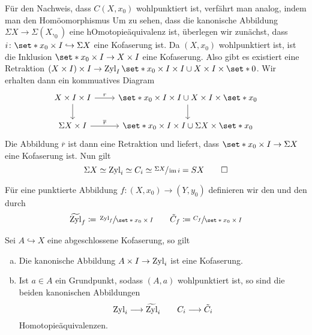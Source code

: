 \begin{beweis}
	Für den Nachweis, dass $C(X,x_0)$ wohlpunktiert ist, verfährt man analog, indem man den Homöomorphismus 
	Um zu sehen, dass die kanonische Abbildung $\Sigma X \to \Sigma(X,_0)$ eine hOmotopieäquivalenz ist, überlegen wir zunächst, dass $i \colon \set*{x_0} \times I \hookrightarrow \Sigma X$ eine Kofaserung ist.
	Da $(X,x_0)$ wohlpunktiert ist, ist die Inklusion $\set*{x_0} \times I \to X \times I$ eine Kofaserung.
	Also gibt es existiert eine Retraktion $(X \times I) \times I \to \Zyl_I \set*{x_0} \times I \times I \cup X \times I \times \set*{0}$.
	Wir erhalten dann ein kommuatives Diagram
	\[
		\begin{tikzcd}
			X \times I \times I \rar["r"] \dar &  \set*{x_0} \times I \times I \cup X \times I \times \set*{x_0} \dar \\
			\Sigma X \times I \rar["\overline{r}"] & \set*{x_0} \times I \times I \cup \Sigma X \times \set*{x_0}
		\end{tikzcd}
	\]
	Die Abbildung $\overline{r}$ ist dann eine Retraktion und liefert, dass $\set*{x_0} \times I \to \Sigma X$ eine Kofaserung ist.
	Nun gilt
	\[
		\Sigma X \simeq \operatorname{Zyl}_i \simeq C_i \simeq \sfrac{\Sigma X}{\operatorname{im} i} = S X \qedhere
	\]
\end{beweis}

\begin{definition}
	Für eine punktierte Abbildung $f \colon (X,x_0) \to (Y,y_0)$ definieren wir den  und den  durch
	\[
		\rZyl_f \coloneqq \sfrac{\Zyl_f}{\set*{x_0} \times I} \qquad \tilde{C}_f \coloneqq \sfrac{C_f}{\set*{x_0} \times I}
	\]
\end{definition}

\begin{satz}[label=satz:abg-kofaserung]
	Sei $A \hookrightarrow X$ eine abgeschlossene Kofaserung, so gilt
	\begin{enumerate}[(a)]
		\item Die kanonische Abbildung $A \times I \to \operatorname{Zyl}_i$ ist eine Kofaserung.
		\item Ist $a \in A$ ein Grundpunkt, sodass $(A,a)$ wohlpunktiert ist, so sind die beiden kanonischen Abbildungen 
		\[
			\operatorname{Zyl}_i \longrightarrow \widetilde{\operatorname{Zyl}}_i \qquad C_i \longrightarrow \tilde{C}_i
		\]
		Homotopieäquivalenzen.
	\end{enumerate}
\end{satz}

